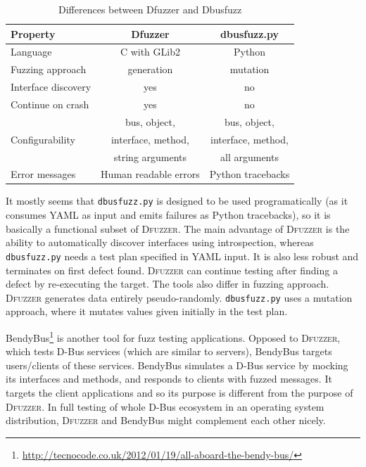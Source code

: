 \documentclass[conference]{IEEEtran}
\begin{document}
\FloatBarrier
\begin{table}[!h]
\caption{Differences between Dfuzzer and Dbusfuzz}
\label{tab:differences}
\begin{center}
	\begin{tabular}{|l|c|c|}
	\hline
	\textbf{Property} & \textbf{Dfuzzer} & \textbf{dbusfuzz.py} \\ \hline \hline
	Language & C with GLib2 & Python \\ \hline
	Fuzzing approach & generation & mutation \\ \hline
	Interface discovery & yes & no \\ \hline
	Continue on crash & yes & no \\ \hline
	& bus, object, & bus, object,  \\
	 Configurability & interface, method, & interface, method, \\
	 & string arguments & all arguments \\ \hline
	Error messages & Human readable errors & Python tracebacks \\ \hline
	\end{tabular}
\end{center}
\end{table}
\FloatBarrier

It mostly seems that \texttt{dbusfuzz.py} is designed to be used programatically
(as it consumes YAML as input and emits failures as Python tracebacks), so it is basically a functional subset of \textsc{Dfuzzer}. The main advantage
of \textsc{Dfuzzer} is the ability to automatically discover interfaces using
introspection, whereas \texttt{dbusfuzz.py} needs a test plan specified in YAML
input.
It is also less robust and terminates on first defect found. \textsc{Dfuzzer} can
continue testing after finding a defect by re-executing the target. The tools
also differ in fuzzing approach. \textsc{Dfuzzer} generates data entirely
pseudo-randomly. \texttt{dbusfuzz.py} uses a mutation approach, where it mutates
values given initially in the test plan.


BendyBus\footnote{\url{http://tecnocode.co.uk/2012/01/19/all-aboard-the-bendy-bus/}}
is another tool for fuzz testing applications. Opposed to \textsc{Dfuzzer},
which tests D-Bus services (which are similar to servers), BendyBus targets
users/clients of these services. BendyBus simulates a D-Bus service by mocking
its interfaces and methods, and responds to clients with fuzzed messages. It
targets the client applications and so its purpose is different from the
purpose of \textsc{Dfuzzer}. In full testing of whole D-Bus ecosystem in an
operating system distribution, \textsc{Dfuzzer} and BendyBus might complement each other nicely.
\end{document}
